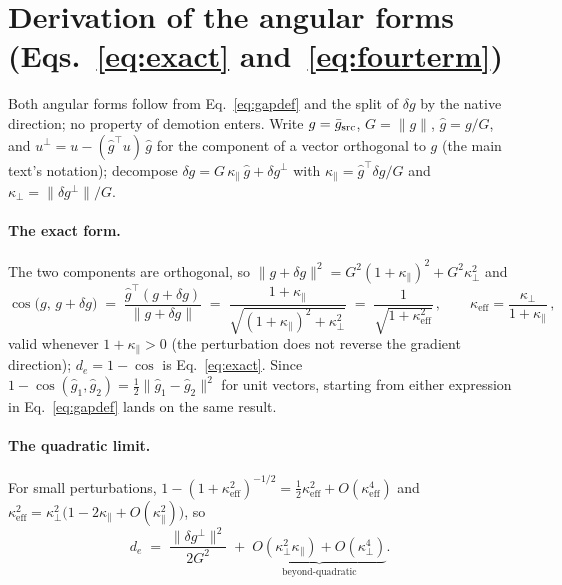 \section{Derivation of the angular forms (Eqs.~\ref{eq:exact}
and~\ref{eq:fourterm})}
\label{app:geometry}

Both angular forms follow from Eq.~\ref{eq:gapdef} and the split of
$\delta g$ by the native direction; no property of demotion enters.
Write $g = \bar g_{\mathrm{src}}$, $G = \|g\|$, $\hat g = g/G$, and
$u^{\perp} = u - (\hat g^{\!\top}u)\,\hat g$ for the component of a
vector orthogonal to $g$ (the main text's notation); decompose
$\delta g = G\,\kappa_\parallel\, \hat g + \delta g^{\perp}$ with
$\kappa_\parallel = \hat g^{\!\top}\delta g / G$ and
$\kappa_\perp = \|\delta g^{\perp}\| / G$.

\paragraph{The exact form.} The two components are orthogonal, so
$\|g + \delta g\|^2 = G^2 (1+\kappa_\parallel)^2 + G^2 \kappa_\perp^2$
and
\begin{equation}
\cos\big(g,\, g + \delta g\big)
\;=\; \frac{\hat g^{\!\top}(g + \delta g)}{\|g + \delta g\|}
\;=\; \frac{1 + \kappa_\parallel}
{\sqrt{(1+\kappa_\parallel)^2 + \kappa_\perp^2}}
\;=\; \frac{1}{\sqrt{1 + \kappa_{\mathrm{eff}}^2}}\,,
\qquad
\kappa_{\mathrm{eff}} = \frac{\kappa_\perp}{1 + \kappa_\parallel}\,,
\label{eq:appexact}
\end{equation}
valid whenever $1 + \kappa_\parallel > 0$ (the perturbation does not
reverse the gradient direction); $d_e = 1 - \cos$ is
Eq.~\ref{eq:exact}. Since
$1 - \cos(\hat g_1, \hat g_2) = \tfrac12 \|\hat g_1 - \hat g_2\|^2$
for unit vectors, starting from either expression in
Eq.~\ref{eq:gapdef} lands on the same result.

\paragraph{The quadratic limit.} For small perturbations,
$1 - (1 + \kappa_{\mathrm{eff}}^2)^{-1/2}
= \tfrac12 \kappa_{\mathrm{eff}}^2 + O(\kappa_{\mathrm{eff}}^4)$ and
$\kappa_{\mathrm{eff}}^2 = \kappa_\perp^2\big(1 - 2\kappa_\parallel
+ O(\kappa_\parallel^2)\big)$, so
\begin{equation}
d_e \;=\; \frac{\|\delta g^{\perp}\|^2}{2 G^2}
\;+\; \underbrace{O(\kappa_\perp^2 \kappa_\parallel)
+ O(\kappa_\perp^4)}_{\text{beyond-quadratic}}.
\label{eq:appquad}
\end{equation}

